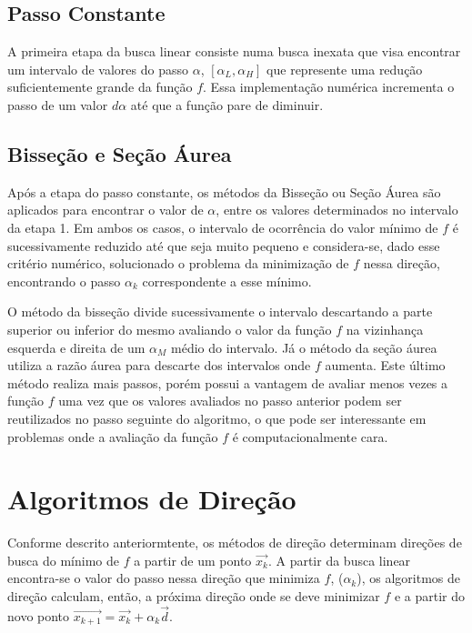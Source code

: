 \documentclass[10pt, a4paper]{article}
\begin{document}
\subsection{Passo Constante}

A primeira etapa da busca linear consiste numa busca inexata que visa encontrar um intervalo de valores do passo $\alpha$, $[\alpha_{L}, \alpha_{H}]$ que represente uma redu\c c\~ao suficientemente grande da fun\c c\~ao $f$. Essa implementa\c c\~ao num\'erica incrementa o passo de um valor $d\alpha$ at\'e que a fun\c c\~ao pare de diminuir.

\subsection{Bisse\c c\~ao e Se\c c\~ao \'Aurea}

Ap\'os a etapa do passo constante, os m\'etodos da Bisse\c c\~ao ou Se\c c\~ao \'Aurea s\~ao aplicados para encontrar o valor de $\alpha$, entre os valores determinados no intervalo da etapa 1. Em ambos os casos, o intervalo de ocorr\^encia do valor m\'inimo de $f$ \'e sucessivamente reduzido at\'e que seja muito pequeno e considera-se, dado esse crit\'erio num\'erico, solucionado o problema da minimiza\c c\~ao de $f$ nessa dire\c c\~ao, encontrando o passo $\alpha_{k}$ correspondente a esse m\'inimo.

O m\'etodo da bisse\c c\~ao divide sucessivamente o intervalo descartando a parte superior ou inferior do mesmo avaliando o valor da fun\c c\~ao $f$ na vizinhan\c ca esquerda e direita de um $\alpha_{M}$ m\'edio do intervalo. J\'a o m\'etodo da se\c c\~ao \'aurea utiliza a raz\~ao \'aurea para descarte dos intervalos onde $f$ aumenta. Este \'ultimo m\'etodo realiza mais passos, por\'em possui a vantagem de avaliar menos vezes a fun\c c\~ao $f$ uma vez que os valores avaliados no passo anterior podem ser reutilizados no passo seguinte do algoritmo, o que pode ser interessante em problemas onde a avalia\c c\~ao da fun\c c\~ao $f$ \'e computacionalmente cara.

\section{Algoritmos de Dire\c c\~ao}

Conforme descrito anteriormtente, os m\'etodos de dire\c c\~ao determinam dire\c c\~oes de busca do m\'inimo de $f$ a partir de um ponto $\vec{x_{k}}$. A partir da busca linear encontra-se o valor do passo nessa dire\c c\~ao que minimiza $f$, ($\alpha_{k}$), os algoritmos de dire\c c\~ao calculam, ent\~ao, a pr\'oxima dire\c c\~ao onde se deve minimizar $f$ e a partir do novo ponto $\vec{x_{k+1}}=\vec{x_k}+\alpha_{k}\vec{d}$.
\end{document}
